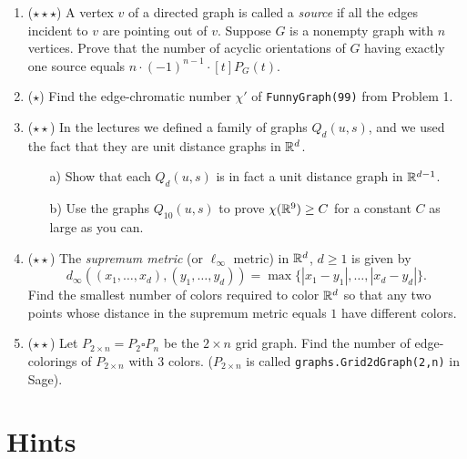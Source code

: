 \begin{enumerate}
\item ($\star\star\star$) A vertex $v$ of a directed graph is called a \emph{source} if all the edges incident to $v$ are pointing out of $v$. Suppose $G$ is a nonempty graph with $n$ vertices. Prove that the number of acyclic orientations of $G$ having exactly one source equals $n\cdot (-1)^{n-1}\cdot [t]P_G(t)$.


\item ($\star$) Find the edge-chromatic number $\chi'$ of \texttt{FunnyGraph(99)} from Problem 1.


\item ($\star\star$) In the lectures we defined a family of graphs $Q_d(u,s)$, and we used the fact that they are unit distance graphs in $\mathbb{R}^d$. 
\begin{itemize}
\item[a)] Show that each $Q_d(u,s)$ is in fact a unit distance graph in $\mathbb{R}^{d-1}$. 
\item[b)] Use the graphs $Q_{10}(u,s)$ to prove $\chi(\mathbb{R}^9)\geq C$ for a constant $C$ as large as you can. 
\end{itemize}


\item ($\star\star$) The \emph{supremum metric} (or $\ell_\infty$ metric) in $\mathbb{R}^d$, $d\geq 1$ is given by
$$d_\infty((x_1,\ldots,x_d),(y_1,\ldots,y_d))=\max\{|x_1-y_1|,\ldots,|x_d-y_d|\}.$$
Find the smallest number of colors required to color $\mathbb{R}^d$ so that any two points whose distance in the supremum metric equals $1$ have different colors.


\item ($\star\star$) Let $P_{2\times n}=P_2\square P_n$ be the $2\times n$ grid graph. Find the number of edge-colorings of $P_{2\times n}$ with $3$ colors. ($P_{2\times n}$ is called \texttt{graphs.Grid2dGraph(2,n)} in Sage).
\end{enumerate}


\section{Hints}

